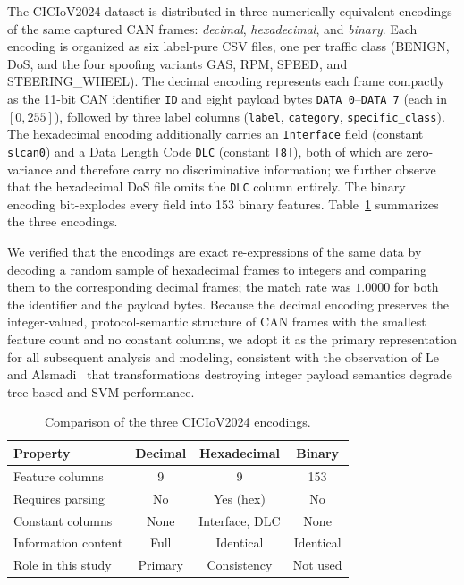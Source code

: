 \documentclass[conference]{IEEEtran}
\begin{document}
The CICIoV2024 dataset is distributed in three numerically equivalent
encodings of the same captured CAN frames: \emph{decimal}, \emph{hexadecimal},
and \emph{binary}. Each encoding is organized as six label-pure CSV files, one
per traffic class (BENIGN, DoS, and the four spoofing variants GAS, RPM, SPEED,
and STEERING\_WHEEL). The decimal encoding represents each frame compactly as the
11-bit CAN identifier \texttt{ID} and eight payload bytes
\texttt{DATA\_0}--\texttt{DATA\_7} (each in $[0,255]$), followed by three label
columns (\texttt{label}, \texttt{category}, \texttt{specific\_class}). The
hexadecimal encoding additionally carries an \texttt{Interface} field (constant
\texttt{slcan0}) and a Data Length Code \texttt{DLC} (constant \texttt{[8]}),
both of which are zero-variance and therefore carry no discriminative
information; we further observe that the hexadecimal DoS file omits the
\texttt{DLC} column entirely. The binary encoding bit-explodes every field into
153 binary features. Table~\ref{tab:encoding_comparison} summarizes the three
encodings.

We verified that the encodings are exact re-expressions of the same data by
decoding a random sample of hexadecimal frames to integers and comparing them to
the corresponding decimal frames; the match rate was $1.0000$ for both the
identifier and the payload bytes. Because the decimal encoding preserves the
integer-valued, protocol-semantic structure of CAN frames with the smallest
feature count and no constant columns, we adopt it as the primary representation
for all subsequent analysis and modeling, consistent with the observation of Le
and Alsmadi~\cite{article_emre} that transformations destroying integer payload
semantics degrade tree-based and SVM performance.

\begin{table}[htbp]
\centering
\caption{Comparison of the three CICIoV2024 encodings.}
\label{tab:encoding_comparison}
\begin{tabular}{lccc}
\hline
Property & Decimal & Hexadecimal & Binary \\
\hline
Feature columns   & 9      & 9              & 153 \\
Requires parsing  & No     & Yes (hex)      & No \\
Constant columns  & None   & Interface, DLC & None \\
Information content & Full  & Identical      & Identical \\
Role in this study & Primary & Consistency  & Not used \\
\hline
\end{tabular}
\end{table}
\end{document}
